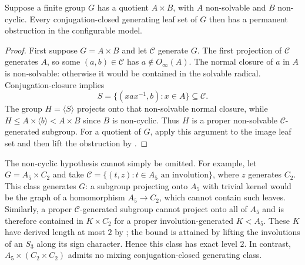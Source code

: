 \begin{corollary}
\label{cor:product-obstruction}
Suppose a finite group $G$ has a quotient $A\times B$, with $A$ non-solvable
and $B$ non-cyclic. Every conjugation-closed generating leaf set of $G$
then has a permanent obstruction in the configurable model.
\end{corollary}
\begin{proof}
First suppose $G=A\times B$ and let $\mathcal C$ generate $G$.
The first projection of $\mathcal C$ generates $A$, so some $(a,b)\in\mathcal C$
has $a\notin O_\infty(A)$. The normal closure of $a$ in $A$ is non-solvable:
otherwise it would be contained in the solvable radical.
Conjugation-closure implies
\[
S=\{(xax^{-1},b):x\in A\}\subseteq\mathcal C.
\]
The group $H=\langle S\rangle$ projects onto that non-solvable normal closure,
while $H\le A\times\langle b\rangle<A\times B$ since $B$ is non-cyclic.
Thus $H$ is a proper non-solvable $\mathcal C$-generated subgroup.
For a quotient of $G$, apply this argument to the image leaf set and
then lift the obstruction by .
\end{proof}

The non-cyclic hypothesis cannot simply be omitted. For example, let
$G=A_5\times C_2$ and take
$\mathcal C=\{(t,z):t\in A_5\text{ an involution}\}$, where $z$ generates $C_2$.
This class generates $G$: a subgroup projecting onto $A_5$ with trivial
kernel would be the graph of a homomorphism $A_5\to C_2$, which cannot
contain such leaves. Similarly, a proper $\mathcal C$-generated subgroup
cannot project onto all of $A_5$ and is therefore contained in $K\times C_2$
for a proper involution-generated $K<A_5$. These $K$ have derived length
at most $2$ by ; the bound is attained by lifting the
involutions of an $S_3$ along its sign character. Hence this class has
exact level $2$. In contrast, $A_5\times(C_2\times C_2)$ admits no mixing
conjugation-closed generating class.
